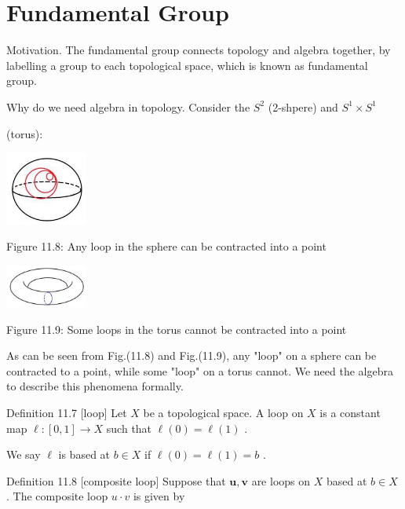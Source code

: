 
\chapter{Fundamental Group}

Motivation. The fundamental group connects topology and algebra together, by labelling a group to each topological space, which is known as fundamental group.

Why do we need algebra in topology. Consider the \({S}^{2}\) (2-shpere) and \({S}^{1} \times  {S}^{1}\)

(torus):

\begin{center}
\includegraphics[max width=0.2\textwidth]{images/bo_d2bcsrref24c73avs720_112_711_510_177_161_0.jpg}
\end{center}
\hspace*{3em} 

Figure 11.8: Any loop in the sphere can be contracted into a point

\begin{center}
\includegraphics[max width=0.2\textwidth]{images/bo_d2bcsrref24c73avs720_112_656_964_289_152_0.jpg}
\end{center}
\hspace*{3em} 

Figure 11.9: Some loops in the torus cannot be contracted into a point

As can be seen from Fig.(11.8) and Fig.(11.9), any "loop" on a sphere can be contracted to a point, while some "loop" on a torus cannot. We need the algebra to describe this phenomena formally.

Definition 11.7 [loop] Let \(X\) be a topological space. A loop on \(X\) is a constant map \(\ell  : \left\lbrack  {0,1}\right\rbrack   \rightarrow  X\) such that \(\ell \left( 0\right)  = \ell \left( 1\right)\) .

We say \(\ell\) is based at \(b \in  X\) if \(\ell \left( 0\right)  = \ell \left( 1\right)  = b\) .

Definition 11.8 [composite loop] Suppose that \(\mathbf{u},\mathbf{v}\) are loops on \(X\) based at \(b \in  X\) . The composite loop \(u \cdot  v\) is given by

